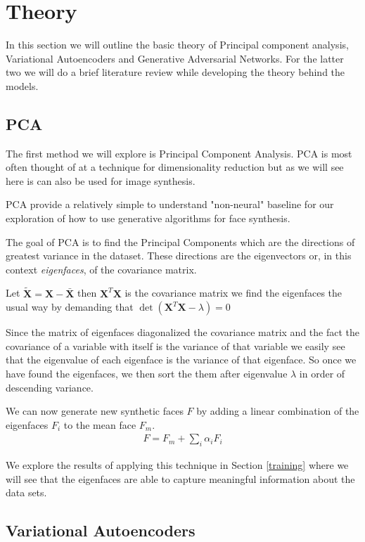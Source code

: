 \newpage
\section{Theory} \label{theory}
In this section we will outline the basic theory of Principal component analysis, Variational Autoencoders and Generative Adversarial Networks. For the latter two we will do a brief literature review while developing the theory behind the models.

\subsection{PCA}
The first method we will explore is Principal Component Analysis. PCA is most often thought of at a technique for dimensionality reduction but as we will see here is can also be used for image synthesis.

PCA provide a relatively simple to understand "non-neural" baseline for our exploration of how to use  generative algorithms for face synthesis.

The goal of PCA is to find the Principal Components which are the directions of greatest variance in the dataset. These directions are the eigenvectors or, in this context \emph{eigenfaces}, of the covariance matrix.

Let $\tilde{\mathbf{X}} = \mathbf{X} - \bar{\mathbf{X}}$ then $\mathbf{X}^T\mathbf{X}$ is the covariance matrix we find the eigenfaces the usual way by demanding that $\det(\mathbf{X}^T\mathbf{X} - \lambda) = 0$

Since the matrix of eigenfaces diagonalized the covariance matrix and the fact the covariance of a variable with itself is the variance of that variable we easily see that the eigenvalue of each eigenface is the variance of that eigenface. So once we have found the eigenfaces, we then sort the them after eigenvalue $\lambda$ in order of descending variance.

We can now generate new synthetic faces $F$ by adding a linear combination of the eigenfaces $F_i$ to the mean face $F_m$.
\begin{align}
F  = F_m + \sum_{i} \alpha_i F_i
\label{eigenface-interpolate}
\end{align}

We explore the results of applying this technique in Section \ref{training} where we will see that the eigenfaces are able to capture meaningful information about the data sets.

\subsection{Variational Autoencoders}


